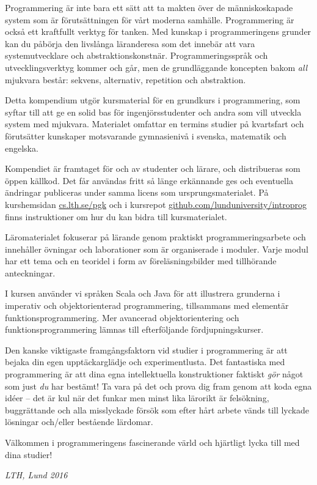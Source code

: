 


Programmering är inte bara ett sätt att ta makten över de människoskapade system som är förutsättningen för vårt moderna samhälle. Programmering är också ett kraftfullt verktyg för tanken. Med kunskap i programmeringens grunder kan du påbörja den livslånga läranderesa som det innebär att vara systemutvecklare och abstraktionskonstnär. Programmeringsspråk och utvecklingsverktyg kommer och går, men de grundläggande koncepten bakom \emph{all} mjukvara består: sekvens, alternativ, repetition och abstraktion. 

Detta kompendium utgör kursmaterial för en grundkurs i programmering, som syftar till att ge en solid bas för ingenjörsstudenter och andra som vill utveckla system med mjukvara. Materialet omfattar en termins studier på kvartsfart och förutsätter kunskaper motsvarande gymnasienivå i svenska, matematik och engelska. 

Kompendiet är framtaget för och av studenter och lärare, och distribueras som öppen källkod. Det får användas fritt så länge erkännande ges och eventuella ändringar publiceras under samma licens som ursprungsmaterialet. På kurshemsidan \href{http://cs.lth.se/pgk}{cs.lth.se/pgk} och i kursrepot \href{http://github.com/lunduniversity/introprog}{github.com/lunduniversity/introprog} finns instruktioner om hur du kan bidra till kursmaterialet.

Läromaterialet fokuserar på lärande genom praktiskt programmeringsarbete och innehåller övningar och laborationer som är organiserade i moduler. Varje modul har ett tema och en teoridel i form av föreläsningsbilder med tillhörande anteckningar. 

I kursen använder vi språken Scala och Java för att illustrera grunderna i imperativ och objektorienterad programmering, tillsammans med elementär funktionsprogrammering. Mer avancerad objektorientering och funktionsprogrammering lämnas till efterföljande fördjupningskurser. 

Den kanske viktigaste framgångsfaktorn vid studier i programmering är att bejaka din egen upptäckarglädje och experimentlusta. Det fantastiska med programmering är att dina egna intellektuella konstruktioner faktiskt \emph{gör} något som just \emph{du} har bestämt! Ta vara på det och prova dig fram genom att koda egna idéer -- det är kul när det funkar men minst lika lärorikt är felsökning, buggrättande och alla misslyckade försök som efter hårt arbete vänds till lyckade lösningar och/eller bestående lärdomar. 

Välkommen i programmeringens fascinerande värld och hjärtligt lycka till med dina studier!

\vspace{2em}\noindent\emph{LTH, Lund 2016}


